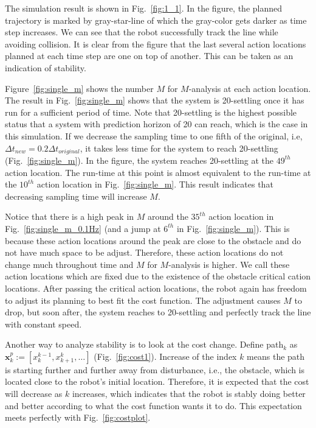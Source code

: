 \documentclass[letterpaper, 10 pt, conference]{ieeeconf}  %
\begin{document}
The simulation result is shown in Fig.~\ref{fig:1_1}. In the figure, the planned trajectory is marked by gray-star-line of which the gray-color gets darker as time step increases. We can see that the robot successfully track the line while avoiding collision. It is clear from the figure that the last several action locations planned at each time step are one on top of another. This can be taken as an indication of stability. 


Figure~\ref{fig:single_m} shows the number $M$ for $M$-analysis at each action location. The result in Fig.~\ref{fig:single_m} shows that the system is 20-settling once it has run for a sufficient period of time. Note that 20-settling is the highest possible status that a system with prediction horizon of 20 can reach, which is the case in this simulation. If we decrease the sampling time to one fifth of the original, i.e, $\Delta t_{new}=0.2\Delta t_{original}$, it takes less time for the system to reach 20-settling (Fig.~\ref{fig:single_m}). In the figure, the system reaches 20-settling at the $49^{th}$ action location. The run-time at this point is almost equivalent to the run-time at the $10^{th}$ action location in Fig.~\ref{fig:single_m}. This result indicates that decreasing sampling time will increase $M$.

Notice that there is a high peak in $M$ around the $35^{th}$ action location in Fig.~\ref{fig:single_m_0.1Hz} (and a jump at $6^{th}$ in Fig.~\ref{fig:single_m}). This is because these action locations around the peak are close to the obstacle and do not have much space to be adjust. Therefore, these action locations do not change much throughout time and $M$ for $M$-analysis is higher. We call these action locations which are fixed due to the existence of the obstacle critical cation locations. After passing the critical action locations, the robot again has freedom to adjust its planning to best fit the cost function. The adjustment causes $M$ to drop, but soon after, the system reaches to 20-settling and perfectly track the line with constant speed. 

Another way to analyze stability is to look at the cost change. Define path$_k$ as $\mathbf{x}_{k}^{p} := [x_{k}^{k-1},x_{k+1}^{k},\ldots]$ (Fig.~\ref{fig:cost1}). Increase of the index $k$ means the path is starting further and further away from disturbance, i.e., the obstacle, which is located close to the robot's initial location. Therefore, it is expected that the cost will decrease as $k$ increases, which indicates that the robot is stably doing better and better according to what the cost function wants it to do. This expectation meets perfectly with Fig.~\ref{fig:costplot}. 
\end{document}
